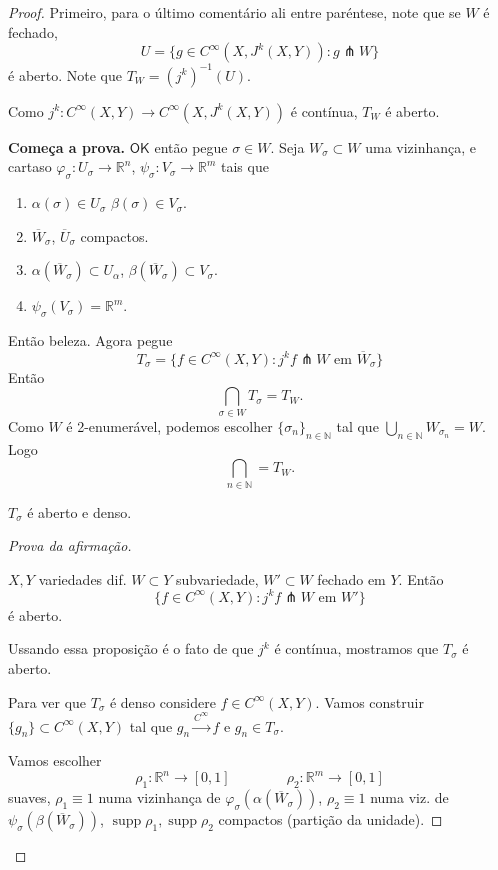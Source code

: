 \begin{proof}\leavevmode
Primeiro, para o último comentário ali entre paréntese, note que se \(W\) é fechado,
\[U=\{g \in C^\infty (X,J^k(X,Y)):g \pitchfork W\}\]
é aberto. Note que \(T_W= (j^k)^{-1}(U)\).

Como \(j^k: C^\infty (X,Y) \to C^\infty (X,J^k(X,Y))\) é contínua, \(T_W\) é aberto.

\textbf{Começa a prova.} $\mathsf{OK}$ então pegue \(\sigma \in W\). Seja \(W_\sigma \subset W\)  uma vizinhança, e cartaso \(\varphi_\sigma: U_\sigma \to \mathbb{R}^n\), \(\psi_\sigma:V_\sigma \to \mathbb{R}^m\) tais que
\begin{enumerate}
\item \(\alpha(\sigma) \in U_\sigma\) \(\beta(\sigma) \in V_\sigma\).
\item \(\overline{W}_\sigma\), \(\overline{U}_\sigma\) compactos.
\item \(\alpha(\overline{W}_\sigma) \subset U_\alpha\), \(\beta(\overline{W}_\sigma) \subset V_\sigma\).
\item \(\psi_\sigma(V_\sigma) = \mathbb{R}^m\).
\end{enumerate}
Então beleza. Agora pegue
\[T_\sigma=\{f \in C^\infty (X,Y): j^kf \pitchfork W \text{ em } \overline{W}_\sigma\}\]
Então
\[\bigcap_{\sigma \in W}T_\sigma=T_W.\]
Como \(W\) é 2-enumerável, podemos escolher \(\{\sigma_n\}_{n \in \mathbb{N}}\) tal que \(\bigcup_{n \in \mathbb{N}}W_{\sigma_n}=W\). Logo
\[ \bigcap_{n \in \mathbb{N}}=T_W.\]
\begin{claim}\leavevmode
\(T_\sigma\) é aberto e denso.
\end{claim}

\begin{proof}[Prova da afirmação]\leavevmode
\begin{prop}\leavevmode
\(X,Y\) variedades dif. \(W\subset Y\) subvariedade, \(W' \subset W\) fechado em \(Y\). Então
 \[\{f \in C^\infty (X,Y): j^kf \pitchfork W \text{ em } W'\}\]
é aberto.
\end{prop}
Ussando essa proposição é o fato de que \(j^k\) é contínua, mostramos que \(T_\sigma\) é aberto.

{\color{6}
Para ver que \(T_\sigma\) é denso considere \(f \in C^\infty (X,Y)\). Vamos construir \(\{ g_n\}\subset C^\infty (X,Y)\) tal que \(g_n \xrightarrow{C^\infty }f\) e \(g_n \in T_\sigma\).}

Vamos escolher
\[\rho_1:\mathbb{R}^n\to[0,1]\qquad \qquad \rho_2:\mathbb{R}^m\to [0,1]\]
suaves, \(\rho_1 \equiv 1\) numa vizinhança de \(\varphi_\sigma(\alpha(\overline{W}_\sigma))\), \(\rho_2 \equiv 1\) numa viz. de \(\psi_\sigma(\beta(\overline{W}_\sigma))\), \(\operatorname{supp}\rho_1, \operatorname{supp}\rho_2\) compactos (partição da unidade).


\end{proof}
\end{proof}
